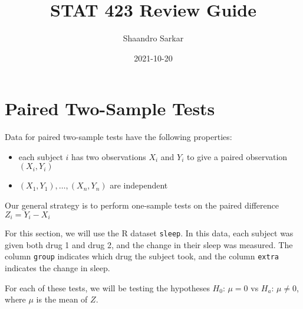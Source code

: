 \documentclass[
]{book}
\title{STAT 423 Review Guide}
\author{Shaandro Sarkar}
\date{2021-10-20}
\newenvironment{Shaded}{\begin{snugshade}}{\end{snugshade}}
\newcommand{\CommentTok}[1]{\textcolor[rgb]{0.56,0.35,0.01}{\textit{#1}}}
\newcommand{\DecValTok}[1]{\textcolor[rgb]{0.00,0.00,0.81}{#1}}
\newcommand{\KeywordTok}[1]{\textcolor[rgb]{0.13,0.29,0.53}{\textbf{#1}}}
\newcommand{\NormalTok}[1]{#1}
\newcommand{\OperatorTok}[1]{\textcolor[rgb]{0.81,0.36,0.00}{\textbf{#1}}}
\newcommand{\StringTok}[1]{\textcolor[rgb]{0.31,0.60,0.02}{#1}}
\providecommand{\tightlist}{%
  \setlength{\itemsep}{0pt}\setlength{\parskip}{0pt}}
\begin{document}
\maketitle

{
\setcounter{tocdepth}{1}
\tableofcontents
}
\hypertarget{paired-two-sample-tests}{%
\chapter{Paired Two-Sample Tests}\label{paired-two-sample-tests}}

Data for paired two-sample tests have the following properties:

\begin{itemize}
\tightlist
\item
  each subject \(i\) has two observations \(X_i\) and \(Y_i\) to give a paired observation \((X_i, Y_i)\)
\item
  \((X_1, Y_1), \dots, (X_n, Y_n)\) are independent
\end{itemize}

Our general strategy is to perform one-sample tests on the paired difference \(Z_i = Y_i - X_i\)

For this section, we will use the R dataset \texttt{sleep}.
In this data, each subject was given both drug 1 and drug 2,
and the change in their sleep was measured.
The column \texttt{group} indicates which drug the subject took,
and the column \texttt{extra} indicates the change in sleep.

\begin{Shaded}
\end{Shaded}

For each of these tests, we will be testing the hypotheses
\(H_0\): \(\mu = 0\) vs \(H_a\): \(\mu \neq 0\),
where \(\mu\) is the mean of \(Z\).
\end{document}
